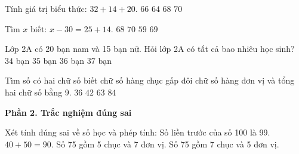 \begin{ex} %
Tính giá trị biểu thức: $32 + 14 + 20$.
\choice
{\True $66$}
{$64$}
{$68$}
{$70$}
\end{ex}

\begin{ex} %
Tìm $x$ biết: $x - 30 = 25 + 14$.
\choice
{$68$}
{$70$}
{$59$}
{\True $69$}
\end{ex}

\begin{ex} %
Lớp 2A có 20 bạn nam và 15 bạn nữ. Hỏi lớp 2A có tất cả bao nhiêu học sinh?
\choice
{$34$ bạn}
{\True $35$ bạn}
{$36$ bạn}
{$37$ bạn}
\end{ex}

\begin{ex} %
Tìm số có hai chữ số biết chữ số hàng chục gấp đôi chữ số hàng đơn vị và tổng hai chữ số bằng 9.
\choice
{$36$}
{$42$}
{\True $63$}
{$84$}
\end{ex}

\textbf{Phần 2. Trắc nghiệm đúng sai}

\begin{ex} %
Xét tính đúng sai về số học và phép tính:
\choiceTF
{\True Số liền trước của số 100 là 99.}
{\True $40 + 50 = 90$.}
{Số 75 gồm 5 chục và 7 đơn vị.}
{\True Số 75 gồm 7 chục và 5 đơn vị.}
\end{ex}

